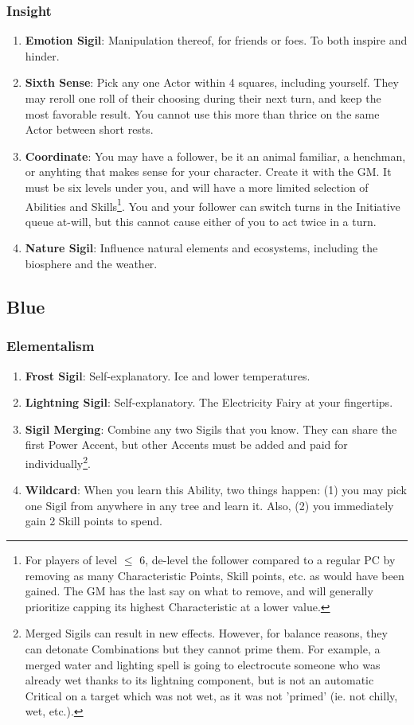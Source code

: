 \subsubsection{Insight}
\begin{enumerate}
    \item \textbf{Emotion Sigil}: Manipulation thereof, for friends or foes. To both inspire and hinder.
    \item \textbf{Sixth Sense}: Pick any one Actor within 4 squares, including yourself. They may reroll one roll of their choosing during their next turn, and keep the most favorable result. You cannot use this more than thrice on the same Actor between short rests.
    \item \textbf{Coordinate}: You may have a follower, be it an animal familiar, a henchman, or anyhting that makes sense for your character. Create it with the GM. It must be six levels under you, and will have a more limited selection of Abilities and Skills\footnote{For players of level $\leq$ 6, de-level the follower compared to a regular PC by removing as many Characteristic Points, Skill points, etc. as would have been gained. The GM has the last say on what to remove, and will generally prioritize capping its highest Characteristic at a lower value.}. You and your follower can switch turns in the Initiative queue at-will, but this cannot cause either of you to act twice in a turn.
    \item \textbf{Nature Sigil}: Influence natural elements and ecosystems, including the biosphere and the weather.
\end{enumerate}


\subsection{Blue}

\subsubsection{Elementalism}
\begin{enumerate}
    \item \textbf{Frost Sigil}: Self-explanatory. Ice and lower temperatures.
    \item \textbf{Lightning Sigil}: Self-explanatory. The Electricity Fairy at your fingertips.
    \item \textbf{Sigil Merging}: Combine any two Sigils that you know. They can share the first Power Accent, but other Accents must be added and paid for individually\footnote{Merged Sigils can result in new effects. However, for balance reasons, they can detonate Combinations but they cannot prime them. For example, a merged water and lighting spell is going to electrocute someone who was already wet thanks to its lightning component, but is not an automatic Critical on a target which was not wet, as it was not 'primed' (ie. not chilly, wet, etc.).}.
    \item \textbf{Wildcard}: When you learn this Ability, two things happen: (1) you may pick one Sigil from anywhere in any tree and learn it. Also, (2) you immediately gain 2 Skill points to spend.
\end{enumerate}

